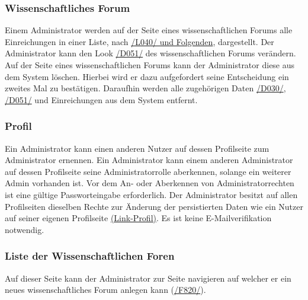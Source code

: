 \subsubsection{Wissenschaftliches Forum}
\begin{description}
     Einem Administrator werden auf der Seite eines wissenschaftlichen Forums
    alle Einreichungen in einer Liste, nach \hyperref[leist:40]{/L040/ und Folgenden}, dargestellt.
     Der Administrator kann den Look \hyperref[d051]{/D051/}
    des wissenschaftlichen Forums verändern.
     Auf der Seite eines wissenschaftlichen Forums kann der Administrator diese aus dem System löschen.
    Hierbei wird er dazu aufgefordert seine Entscheidung ein zweites Mal zu bestätigen.
    Daraufhin werden alle zugehörigen Daten \hyperref[d030]{/D030/}, \hyperref[d051]{/D051/}
    und Einreichungen aus dem System entfernt.
\end{description}

\subsubsection{Profil}
\begin{description}
     Ein Administrator kann einen anderen Nutzer auf dessen Profilseite zum Administrator ernennen.
     Ein Administrator kann einem anderen Administrator auf dessen Profilseite seine
    Administratorrolle aberkennen, solange ein weiterer Admin vorhanden ist.
     Vor dem An- oder Aberkennen von Administratorrechten ist eine gültige
    Passworteingabe erforderlich.
     Der Administrator besitzt auf allen Profilseiten dieselben Rechte zur Änderung
    der persistierten Daten wie ein Nutzer auf seiner eigenen Profilseite
    \hyperref[nut:profil]{(Link-Profil)}. Es ist keine E-Mailverifikation notwendig.
\end{description}

\subsubsection{Liste der Wissenschaftlichen Foren}
\begin{description}
     Auf dieser Seite kann der Administrator zur Seite navigieren auf welcher er ein neues
    wissenschaftliches Forum anlegen kann (\hyperref[funkt:820]{/F820/}).
\end{description}

